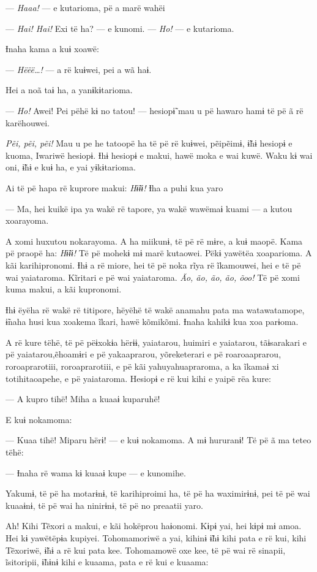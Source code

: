--- \textit{Haaa!} --- e kutarioma, pë a marë wahëi 

--- \textit{Hai! Hai!} Exi të ha? --- e kunomi. --- \textit{Ho!} --- e kutarioma. 

Ɨnaha kama a kuɨ xoawë:

--- \textit{Hëëë…!} --- a rë kuɨwei, pei a wã haɨ. 

Hei a noã taɨ ha, a yanɨkɨtarioma. 

--- \textit{Ho!} Awei! Pei pëhë kɨ no tatou! --- hesiopɨ̃ mau u pë hawaro hamɨ të
pë ã rë karëhouwei. 

\textit{Pẽi, pẽi, pẽi!} Mau u pe he tatoopë ha të pë rë kuɨwei, pẽipẽimɨ, ɨ̃hɨ
hesiopɨ e kuoma, Iwariwë hesiopɨ. Ɨhɨ hesiopɨ e makui, hawë moka e wai
kuwë. Waku kɨ wai oni, ɨ̃hɨ e kuɨ ha, e yai yɨkɨtarioma. 

Ai të pë hapa rë kuprore makui: \textit{Hɨ̃ɨɨ!} Ɨha a puhi kua yaro 

--- Ma, hei kuikë ipa ya wakë rë tapore, ya wakë wawëmaɨ kuami --- a
kutou xoarayoma. 

A xomi huxutou nokarayoma. A ha miikunɨ, të pë rë mɨre, a kuɨ maopë.
Kama pë praopë ha: \textit{Hɨ̃ɨɨ! }Të pë mohekɨ mɨ marë kutaowei. Pëkɨ yawëtëa
xoaparioma. A kãi karihipronomi. Ɨhɨ a rë miore, hei të pë noka rĩya rë
ĩkamouwei, hei e të pë wai yaiataroma. Kĩritari e pë wai yaiataroma. \textit{Ão,
ão, ão, ão, õoo!} Të pë xomi kuma makui, a kãi kupronomi. 

Ɨhɨ ëyëha rë wakë rë titipore, hëyëhë të wakë anamahu pata ma
watawatamope, ɨ̃naha husi kua xoakema ĩkari, hawë kõmikõmi. Ɨnaha kahikɨ
kua xoa parɨoma. 

A rë kure tëhë, të pë pëɨxokɨa hërɨɨ, yaiatarou, huimiri e yaiatarou,
tãɨsarakari e pë yaiatarou,ẽhoamɨri e pë yakaaprarou, yõreketerari e pë
roaroaaprarou, roroaprarotiii, roroaprarotiii, e pë kãi
yahuyahuapraroma, a ka ĩkamaɨ xi totihitaoapehe, e pë yaiataroma.
Hesiopɨ e rë kui kihi e yaipë rëa kure: 

--- A kupro tihë! Miha a kuaaɨ kuparuhë! 

E kuɨ nokamoma: 

--- Kuaa tihë! Miparu hërɨ! --- e kuɨ nokamoma. A mɨ hururanɨ! Të pë ã
ma teteo tëhë:

--- Ɨnaha rë wama kɨ kuaaɨ kupe --- e kunomihe. 

Yakumɨ, të pë ha motarɨnɨ, të karihiproimi ha, të pë ha waximirɨnɨ, pei
të pë wai kuaaɨnɨ, të pë wai ha ninirɨnɨ, të pë no preaatii yaro. 

Ah! Kihi Tẽxori a makui, e kãi hokëprou haɨonomi. Kɨpɨ yai, hei kɨpɨ mɨ
amoa. Hei kɨ yawëtëpɨa kupiyei. Tohomamoriwë a yai, kihinɨ ɨ̃hɨ kihi pata
e rë kui, kihi Tẽxoriwë, ɨ̃hɨ a rë kui pata kee. Tohomamowë oxe kee, të
pë wai rë sinapii, ĩsitoripii, ɨ̃hɨnɨ kihi e kuaama, pata e rë kui e
kuaama: 

